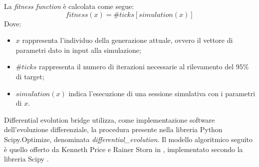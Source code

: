 La \textit{fitness function} è calcolata come segue:
\begin{equation*}
    fitness(x) = \#ticks[simulation(x)]
\end{equation*}
Dove:
\begin{itemize}
    \item $x$ rappresenta l'individuo della generazione attuale, ovvero il vettore di parametri dato in input alla simulazione;
    \item $\#ticks$ rappresenta il numero di iterazioni necessarie al rilevamento del $95\%$ di target;
    \item $simulation(x)$ indica l'esecuzione di una sessione simulativa con i parametri di $x$.
\end{itemize}

Differential evolution bridge utilizza, come implementazione software dell’evoluzione differenziale, la procedura presente nella libreria Python Scipy.Optimize, denominata \textit{differential\_evolution}.
Il modello algoritmico seguito è quello offerto da Kenneth Price e Rainer Storn in \cite{storn1997differential}, implementato secondo la libreria Scipy \cite{jones2014scipy}.
